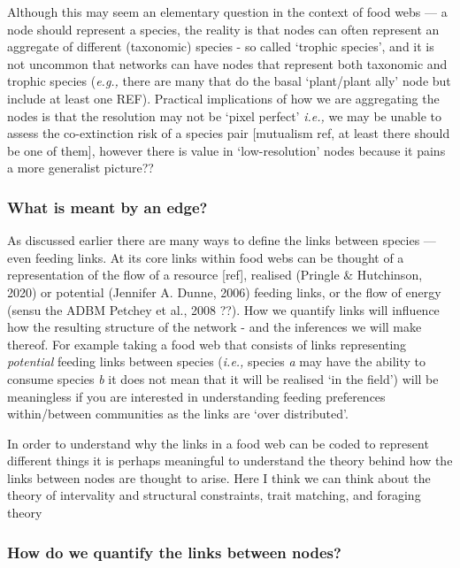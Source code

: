 \documentclass[
]{agujournal2019}
\begin{document}
Although this may seem an elementary question in the context of food
webs --- a node should represent a species, the reality is that nodes
can often represent an aggregate of different (taxonomic) species - so
called `trophic species', and it is not uncommon that networks can have
nodes that represent both taxonomic and trophic species (\emph{e.g.,}
there are many that do the basal `plant/plant ally' node but include at
least one REF). Practical implications of how we are aggregating the
nodes is that the resolution may not be `pixel perfect' \emph{i.e.,} we
may be unable to assess the co-extinction risk of a species pair
{[}mutualism ref, at least there should be one of them{]}, however there
is value in `low-resolution' nodes because it pains a more generalist
picture??

\subsubsection{What is meant by an
edge?}\label{what-is-meant-by-an-edge}

As discussed earlier there are many ways to define the links between
species --- even feeding links. At its core links within food webs can
be thought of a representation of the flow of a resource {[}ref{]},
realised (Pringle \& Hutchinson, 2020) or potential (Jennifer A. Dunne,
2006) feeding links, or the flow of energy (sensu the ADBM Petchey et
al., 2008 ??). How we quantify links will influence how the resulting
structure of the network - and the inferences we will make thereof. For
example taking a food web that consists of links representing
\emph{potential} feeding links between species (\emph{i.e.,} species
\emph{a} may have the ability to consume species \emph{b} it does not
mean that it will be realised `in the field') will be meaningless if you
are interested in understanding feeding preferences within/between
communities as the links are `over distributed'.

In order to understand why the links in a food web can be coded to
represent different things it is perhaps meaningful to understand the
theory behind how the links between nodes are thought to arise. Here I
think we can think about the theory of intervality and structural
constraints, trait matching, and foraging theory

\subsubsection{How do we quantify the links between
nodes?}\label{how-do-we-quantify-the-links-between-nodes}
\end{document}
